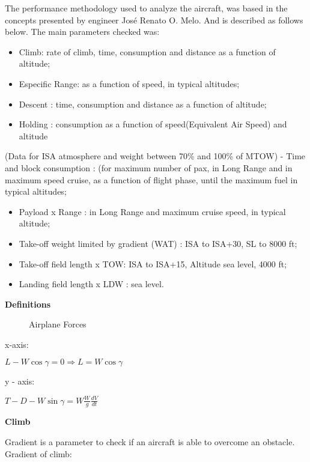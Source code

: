 The performance methodology used to analyze the aircraft, was based in the concepts presented by engineer Jos\'e Renato O. Melo. And is described as follows below.
	The main parameters checked was:

\begin{itemize}
  \item Climb: rate of climb, time, consumption and distance as a function of altitude;
  \item Especific Range: as a function of speed, in typical altitudes;
  \item Descent : time, consumption and distance as a function of altitude;
  \item Holding : consumption as a function of speed(Equivalent Air Speed) and altitude
\end{itemize}


       (Data for ISA atmosphere and weight  between 70\% and 100\% of MTOW)
- Time and block consumption :
(for maximum number of pax, in Long Range and in maximum speed cruise, as a function of flight phase, until the maximum fuel in typical altitudes;

\begin{itemize}
  \item Payload x Range : in Long Range and maximum cruise speed, in typical  altitude;
  \item Take-off weight limited by gradient (WAT) : ISA to ISA+30, SL to 8000 ft;
  \item Take-off field length x TOW: ISA to ISA+15, Altitude sea level, 4000 ft;
  \item Landing field length x LDW :  sea level.
\end{itemize}


\textbf{Definitions}

\begin{figure}[H] %
\caption{Airplane Forces}
\label{fig:forces}
\end{figure}

x-axis:

$L-W\cos\gamma = 0 \Rightarrow L = W\cos\gamma$

y - axis:

$T - D - W\sin\gamma = W \frac{W}{g} \frac{dV}{dt} $


\textbf{Climb}

Gradient is a parameter to check if an aircraft is able to overcome an obstacle. Gradient of climb:


